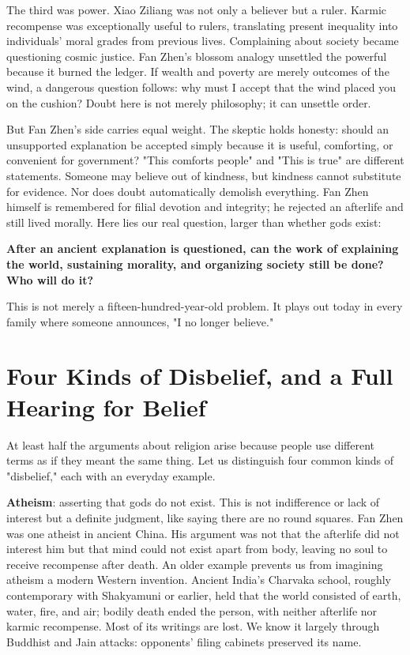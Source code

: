 The third was power. Xiao Ziliang was not only a believer but a ruler. Karmic recompense was exceptionally useful to rulers, translating present inequality into individuals' moral grades from previous lives. Complaining about society became questioning cosmic justice. Fan Zhen's blossom analogy unsettled the powerful because it burned the ledger. If wealth and poverty are merely outcomes of the wind, a dangerous question follows: why must I accept that the wind placed you on the cushion? Doubt here is not merely philosophy; it can unsettle order.

But Fan Zhen's side carries equal weight. The skeptic holds honesty: should an unsupported explanation be accepted simply because it is useful, comforting, or convenient for government? "This comforts people" and "This is true" are different statements. Someone may believe out of kindness, but kindness cannot substitute for evidence. Nor does doubt automatically demolish everything. Fan Zhen himself is remembered for filial devotion and integrity; he rejected an afterlife and still lived morally. Here lies our real question, larger than whether gods exist:

\textbf{After an ancient explanation is questioned, can the work of explaining the world, sustaining morality, and organizing society still be done? Who will do it?}

This is not merely a fifteen-hundred-year-old problem. It plays out today in every family where someone announces, "I no longer believe."

\section[Disbelief and the Case for Belief]{Four Kinds of Disbelief, and a Full Hearing for Belief}
At least half the arguments about religion arise because people use different terms as if they meant the same thing. Let us distinguish four common kinds of "disbelief," each with an everyday example.

\textbf{Atheism}: asserting that gods do not exist. This is not indifference or lack of interest but a definite judgment, like saying there are no round squares. Fan Zhen was one atheist in ancient China. His argument was not that the afterlife did not interest him but that mind could not exist apart from body, leaving no soul to receive recompense after death. An older example prevents us from imagining atheism a modern Western invention. Ancient India's Charvaka school, roughly contemporary with Shakyamuni or earlier, held that the world consisted of earth, water, fire, and air; bodily death ended the person, with neither afterlife nor karmic recompense. Most of its writings are lost. We know it largely through Buddhist and Jain attacks: opponents' filing cabinets preserved its name.


